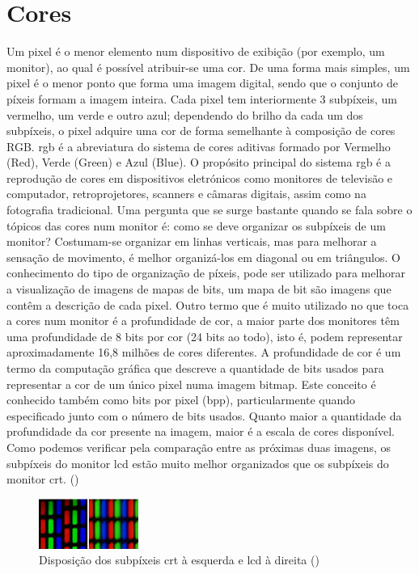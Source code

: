 \documentclass[a4paper]{report}
\begin{document}
\chapter{Cores}
\label{chap.Cores}

Um pixel é o menor elemento num dispositivo de exibição (por exemplo, um monitor), ao qual é possível atribuir-se uma cor. De uma forma mais simples, um pixel é o menor ponto que forma uma imagem digital, sendo que o conjunto de píxeis formam a imagem inteira.
Cada pixel tem interiormente 3 subpíxeis, um vermelho, um verde e outro azul; dependendo do brilho da cada um dos subpíxeis, o pixel adquire uma cor de forma semelhante à composição de cores RGB. \ac{rgb} é a abreviatura do sistema de cores aditivas formado por Vermelho (Red), Verde (Green) e Azul (Blue). O propósito principal do sistema \ac{rgb} é a reprodução de cores em dispositivos eletrónicos como monitores de televisão e computador, retroprojetores, scanners e câmaras digitais, assim como na fotografia tradicional.
Uma pergunta que se surge bastante quando se fala sobre o tópicos das cores num monitor é: como se deve organizar os subpíxeis de um monitor? Costumam-se organizar em linhas verticais, mas para melhorar a sensação de movimento, é melhor organizá-los em diagonal ou em triângulos. O conhecimento do tipo de organização de píxeis, pode ser utilizado para melhorar a visualização de imagens de mapas de bits, um mapa de bit são imagens que contêm a descrição de cada pixel.
Outro termo que é muito utilizado no que toca a cores num monitor é a profundidade de cor, a maior parte dos monitores têm uma profundidade de 8 bits por cor (24 bits ao todo), isto é, podem representar aproximadamente 16,8 milhões de cores diferentes.
A profundidade de cor é um termo da computação gráfica que descreve a quantidade de bits usados para representar a cor de um único pixel numa imagem bitmap. Este conceito é conhecido também como bits por pixel (bpp), particularmente quando especificado junto com o número de bits usados. Quanto maior a quantidade da profundidade da cor presente na imagem, maior é a escala de cores disponível.
Como podemos verificar pela comparação entre as próximas duas imagens, os subpíxeis do monitor \ac{lcd} estão muito melhor organizados que os subpíxeis do monitor \ac{crt}. (\cite{p, mc, mb, pc})
\begin{center}
\begin{figure}[H]
\center
\includegraphics[width=3.25cm]{imagens/crtp.png}
\caption{Disposição dos subpíxeis \ac{crt} à esquerda e \ac{lcd} à direita (\cite{mc})}
\end{figure}
\end{center}
\end{document}
